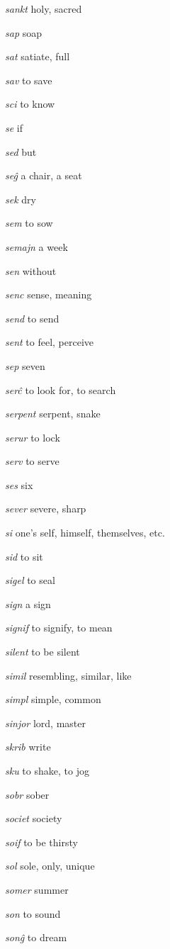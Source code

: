 \begin{landscape}
\begin{multicols}{5}
\begin{outdent}{1em}
\emph{sankt}  holy, sacred

\emph{sap}  soap

\emph{sat } satiate, full

\emph{sav } to save

\emph{sci}  to know

\emph{se } if

\emph{sed}  but

\emph{seĝ } a chair, a seat

\emph{sek } dry

\emph{sem}  to sow

\emph{semajn}  a week

\emph{sen}  without

\emph{senc}  sense, meaning

\emph{send}  to send

\emph{sent}  to feel, perceive

\emph{sep } seven

\emph{serĉ}  to look for, to search

\emph{serpent}  serpent, snake

\emph{serur}  to lock

\emph{serv}  to serve

\emph{ses } six

\emph{sever}  severe, sharp

\emph{si}  one’s self, himself, themselves, etc.

\emph{sid}  to sit

\emph{sigel } to seal

\emph{sign } a sign

\emph{signif}  to signify, to mean

\emph{silent}  to be silent

\emph{simil}  resembling, similar, like

\emph{simpl}  simple, common

\emph{sinjor}  lord, master

\emph{skrib } write

\emph{sku}  to shake, to jog

\emph{sobr}  sober

\emph{societ } society

\emph{soif}  to be thirsty

\emph{sol}  sole, only, unique

\emph{somer}  summer

\emph{son}  to sound

\emph{sonĝ}  to dream


\end{outdent}
\end{multicols}
\end{landscape}
